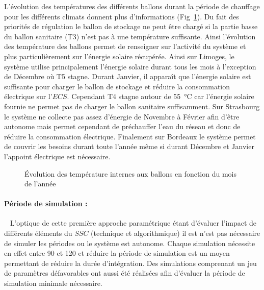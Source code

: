 L’évolution des températures des différents ballons durant la période de chauffage pour
les différents climats donnent plus d’informations (Fig~\ref{fig:temp_ballon_mensuel}). Du fait des priorités de régulation
le ballon de stockage ne peut être chargé si la partie basse du ballon sanitaire (T3)
n’est pas à une température suffisante. Ainsi l’évolution des température des ballons
permet de renseigner sur l’activité du système et plus particulièrement sur l’énergie solaire
récupérée. Ainsi sur Limoges, le système utilise principalement l’énergie solaire durant tous
les mois à l’exception de Décembre où T5 stagne. Durant Janvier, il apparaît que
l’énergie solaire est suffisante pour charger le ballon de stockage et réduire la
consommation électrique sur l’$ECS$. Cependant T4 stagne autour de \SI{55}{\celsius}
car l’énergie solaire fournie ne permet pas de charger le ballon sanitaire suffisamment.
Sur Strasbourg le système ne collecte pas assez d’énergie de Novembre à Février afin
d’être autonome mais permet cependant de préchauffer l’eau du réseau et donc de réduire
la consommation électrique. Finalement sur Bordeaux le système permet de couvrir les
besoins durant toute l’année même si durant Décembre et Janvier l’appoint électrique
est nécessaire.

\begin{figure}
    \begin{center}
    \end{center}
    \caption{Évolution des température internes aux ballons en fonction du mois
             de l’année \label{fig:temp_ballon_mensuel}}
\end{figure}


\paragraph{Période de simulation :} %
\label{par:période_de_simulation}
~
L’optique de cette première approche paramétrique étant d’évaluer l’impact de différents
éléments du $SSC$ (technique et algorithmique) il est n’est pas nécessaire de simuler les
périodes ou le système est autonome. Chaque simulation nécessite en effet entre
\SI{90}{\min} et \SI{120}{\min} et réduire la période de simulation est un moyen
permettant de réduire la durée d’intégration. Des simulations comprenant un jeu de
paramètres défavorables ont aussi été réalisées afin d’évaluer la période de simulation
minimale nécessaire.

